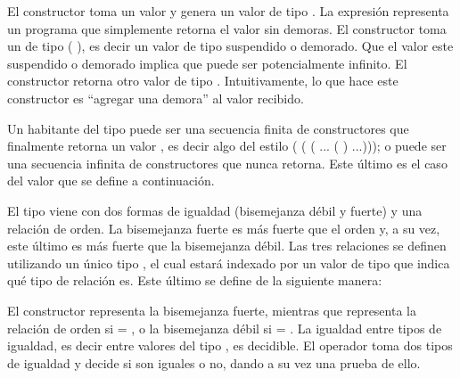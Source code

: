 
El constructor  toma un valor  \AgdaSymbol{:}  y genera un valor de tipo  \AgdaDatatype{$\bot$}. La expresión   representa un programa que simplemente retorna el valor  sin demoras. 
El constructor  toma un  de tipo \AgdaFunction{$\infty$} ( \AgdaDatatype{$\bot$}), es decir un valor de tipo  \AgdaDatatype{$\bot$} suspendido o demorado. Que el valor este suspendido o demorado implica que puede ser potencialmente infinito. El constructor  retorna otro valor de tipo  \AgdaDatatype{$\bot$}. Intuitivamente, lo que hace este constructor es ``agregar una demora'' al valor recibido. 

Un habitante del tipo  \AgdaDatatype{$\bot$} puede ser una secuencia finita de constructores  que finalmente retorna un valor  \AgdaSymbol{:} , es decir algo del estilo  (\AgdaFunction{$\sharp$} ( (\AgdaFunction{$\sharp$} ... ( ) ...))); o puede ser una secuencia infinita de constructores  que nunca retorna. Este último es el caso del valor  que se define a continuación. 


El tipo \AgdaDatatype{\_$\bot$} viene con dos formas de igualdad (bisemejanza débil y fuerte) y una relación de orden. La bisemejanza fuerte es más fuerte que el orden y, a su vez, este último es más fuerte que la bisemejanza débil. Las tres relaciones se definen utilizando un único tipo , el cual estará indexado por un valor de tipo  que indica qué tipo de relación es. Este último se define de la siguiente manera:


El constructor  representa la bisemejanza fuerte, mientras que   representa la relación de orden si  = , o la bisemejanza débil si  = . La igualdad entre tipos de igualdad, es decir entre valores del tipo , es decidible. El operador  toma dos tipos de igualdad y decide si son iguales o no, dando a su vez una prueba de ello. 

